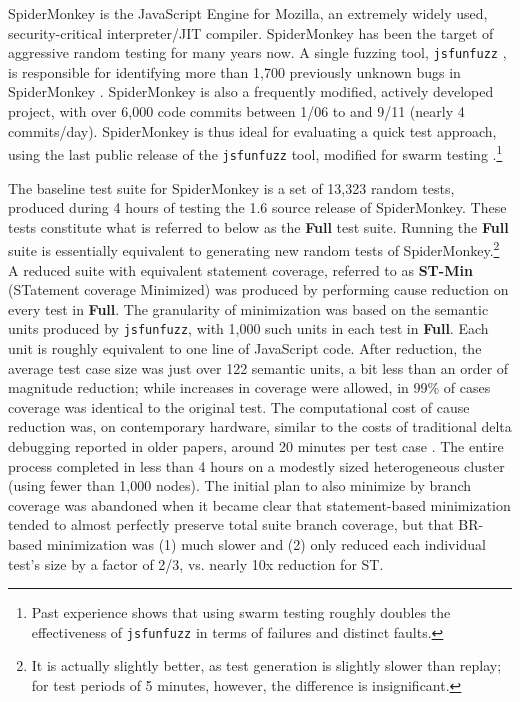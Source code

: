 SpiderMonkey is the JavaScript Engine for Mozilla, an extremely widely
used, security-critical interpreter/JIT compiler.  SpiderMonkey has
been the target of aggressive random testing for many years now.  A
single fuzzing tool, \texttt{jsfunfuzz} \cite{jsfunfuzz}, is
responsible for identifying more than 1,700 previously unknown bugs in
SpiderMonkey \cite{jsfunfuzzbugs}.  SpiderMonkey is also a frequently
modified, actively developed project, with over 6,000 code commits
between 1/06 to and 9/11 (nearly 4 commits/day).  SpiderMonkey is thus
ideal for evaluating a quick test approach, using the last public
release of the \texttt{jsfunfuzz} tool, modified for swarm testing
\cite{ISSTA12}.\footnote{Past experience shows that using swarm testing
roughly doubles the effectiveness of \texttt{jsfunfuzz} in terms of
failures and distinct faults.}
 

The baseline test suite for SpiderMonkey is a set of 13,323 random
tests, produced during 4 hours of testing the 1.6 source release of
SpiderMonkey.  These tests constitute what is referred to below as the
{\bf Full} test suite.  Running the {\bf Full} suite is essentially
equivalent to generating new random tests of SpiderMonkey.\footnote{It
is actually slightly better, as test generation is slightly slower
than replay; for test periods of 5 minutes, however, the difference is
insignificant.}  A reduced suite with equivalent statement coverage,
referred to as {\bf ST-Min} (STatement coverage Minimized) was
produced by performing cause reduction on every test in {\bf Full}.
The granularity of minimization was based on the semantic units
produced by \texttt{jsfunfuzz}, with 1,000 such units in each test in
{\bf Full}.  Each unit is roughly equivalent to one line of JavaScript
code.  After reduction, the average test case size was just over 122
semantic units, a bit less than an order of magnitude reduction; while
increases in coverage were allowed, in 99\% of cases coverage was
identical to the original test.  The computational cost of cause
reduction was, on contemporary hardware, similar to the costs of
traditional delta debugging reported in older papers, around 20
minutes per test case \cite{MinUnit}.  The entire process completed in
less than 4 hours on a modestly sized heterogeneous cluster (using
fewer than 1,000 nodes).  The initial plan to also minimize by branch
coverage was abandoned when it became clear that statement-based
minimization tended to almost perfectly preserve total suite branch
coverage, but that BR-based minimization was (1) much slower and (2)
only reduced each individual test's size by a factor of 2/3,
vs. nearly 10x reduction for ST.

